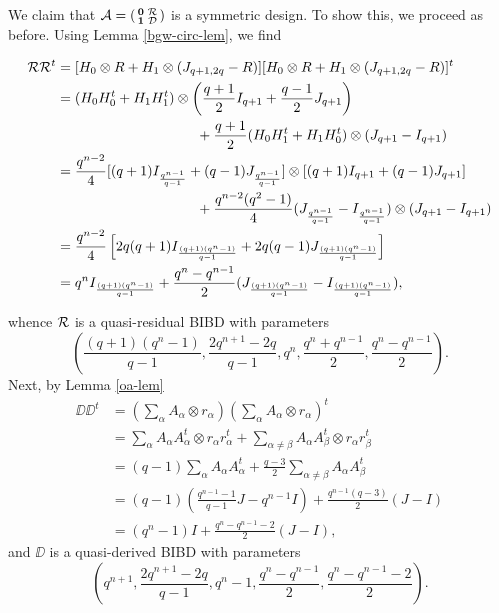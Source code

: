 \documentclass[../../../main]{subfiles}
\begin{document}
We claim that $\mathcal{A} = \left(\begin{smallmatrix} \mathbf{0} & \mathcal{R} \\ \mathbf{1} & \mathcal{D} \end{smallmatrix}\right)$ is a symmetric design. To show this, we proceed as before. Using Lemma \ref{bgw-circ-lem}, we find
\begin{small}
\begin{align*}
 \mathcal{R}\mathcal{R}^t &= [H_0 \otimes R + H_1 \otimes (J_{q+1,2q}-R)][H_0 \otimes R + H_1 \otimes (J_{q+1,2q}-R)]^t \\
 &= (H_0H_0^t+H_1H_1^t) \otimes \left( \frac{q+1}{2}I_{q+1}+\frac{q-1}{2}J_{q+1} \right) \\&\qquad\qquad\qquad\qquad\qquad+ \frac{q+1}{2}(H_0H_1^t+H_1H_0^t) \otimes (J_{q+1}-I_{q+1}) \\
 &= \frac{q^{n-2}}{4}[(q+1)I_\frac{q^{n-1}}{q-1}+(q-1)J_\frac{q^{n-1}}{q-1}] \otimes [(q+1)I_{q+1}+(q-1)J_{q+1}] \\
 &\qquad\qquad\qquad\qquad\qquad+ \frac{q^{n-2}(q^2-1)}{4}(J_\frac{q^{n-1}}{q-1}-I_\frac{q^{n-1}}{q-1}) \otimes (J_{q+1}-I_{q+1}) \\
 &= \frac{q^{n-2}}{4}\left[ 2q(q+1)I_\frac{(q+1)(q^n-1)}{q-1} + 2q(q-1)J_\frac{(q+1)(q^n-1)}{q-1} \right] \\
 &= q^nI_\frac{(q+1)(q^n-1)}{q-1} + \frac{q^n-q^{n-1}}{2}(J_\frac{(q+1)(q^n-1)}{q-1}-I_\frac{(q+1)(q^n-1)}{q-1}),
\end{align*}
\end{small}
whence $\mathcal{R}$ is a quasi-residual BIBD with parameters 
\[
\left(
\frac{(q+1)(q^n-1)}{q-1},\frac{2q^{n+1}-2q}{q-1},q^n,\frac{q^n+q^{n-1}}{2},\frac{q^n-q^{n-1}}{2}
\right).
\]
Next, by Lemma \ref{oa-lem}
\begin{align*}
 \DD\DD^t &= \left( \sum_\alpha A_\alpha \otimes r_\alpha \right)\left( \sum_\alpha A_\alpha \otimes r_\alpha \right)^t \\
 &= \sum_\alpha A_\alpha A_\alpha^t \otimes r_\alpha r_\alpha^t + \sum_{\alpha\neq\beta} A_\alpha A_\beta^t \otimes r_\alpha r_\beta^t \\
 &= (q-1)\sum_\alpha A_\alpha A_\alpha^t + \frac{q-3}{2}\sum_{\alpha\neq\beta} A_\alpha A_\beta^t \\
 &= (q-1)\left( \frac{q^{n-1}-1}{q-1}J - q^{n-1}I \right) + \frac{q^{n-1}(q-3)}{2}(J-I) \\
 &= (q^n-1)I + \frac{q^n-q^{n-1}-2}{2}(J-I),
\end{align*}
and $\DD$ is a quasi-derived BIBD with parameters
\[
 \left(
 q^{n+1}, \frac{2q^{n+1}-2q}{q-1}, q^n-1, \frac{q^n-q^{n-1}}{2}, \frac{q^n-q^{n-1}-2}{2}
 \right).
\]
\end{document}
